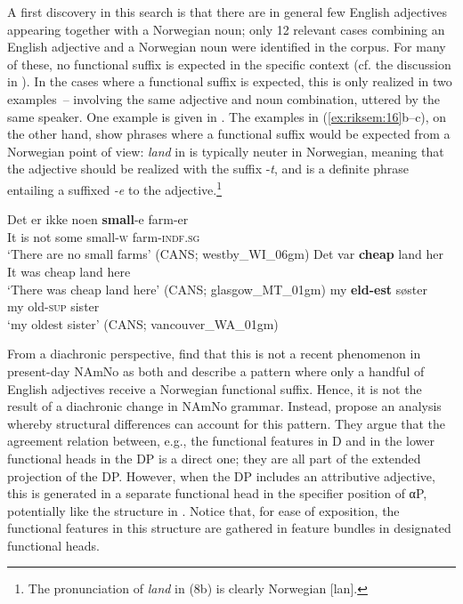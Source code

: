 \documentclass[output=paper]{langscibook}
\begin{document}
A first discovery in this search is that there are in general few English adjectives appearing together with a Norwegian noun; only 12 relevant cases combining an English adjective and a Norwegian noun were identified in the corpus. For many of these, no functional suffix is expected in the specific context (cf. the discussion in ). In the cases where a functional suffix is expected, this is only realized in two examples~– involving the same adjective and noun combination, uttered by the same speaker. One example is given in . The examples in (\ref{ex:riksem:16}b–c), on the other hand, show phrases where a functional suffix would be expected from a Norwegian point of view: \textit{land} in  is typically neuter in Norwegian, meaning that the adjective should be realized with the suffix -\textit{t}, and  is a definite phrase entailing a suffixed \textit{{}-e} to the adjective.\footnote{The pronunciation of \emph{land} in (8b) is clearly Norwegian [lan].}         


\ea \label{ex:riksem:16}
\ea \label{ex:riksem:16a}
\gll Det er ikke noen \textbf{small}{}-e farm-er\\
	 It     is   not  some small-\textsc{w} farm-\textsc{indf.sg}\\
\glt ‘There are no small farms’  (CANS; westby\_WI\_06gm)
\ex \label{ex:riksem:16b}
\gll Det var \textbf{cheap} land her\\
	 It     was cheap land here\\
\glt ‘There was cheap land here’ (CANS; glasgow\_MT\_01gm)
\ex \label{ex:riksem:16c}
\gll my \textbf{eld-est} søster\\
	 my old-\textsc{sup} sister\\
\glt ‘my oldest sister’ (CANS; vancouver\_WA\_01gm)
\z
\z

From a diachronic perspective, \citet{RiksemEtAl2021} find that this is not a recent phenomenon in present-day NAmNo as both \citet{Haugen1953} and \citet{Hjelde1992} describe a pattern where only a handful of English adjectives receive a Norwegian functional suffix. Hence, it is not the result of a diachronic change in NAmNo grammar. Instead, \citet{RiksemEtAl2021} propose an analysis whereby structural differences can account for this pattern. They argue that the agreement relation between, e.g., the functional features in D and in the lower functional heads in the DP is a direct one; they are all part of the extended projection of the DP. However, when the DP includes an attributive adjective, this is generated in a separate functional head in the specifier position of αP, potentially like the structure in . Notice that, for ease of exposition, the functional features in this structure are gathered in feature bundles in designated functional heads.
\end{document}
